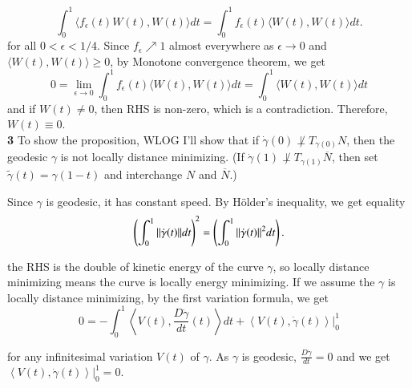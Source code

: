 \documentclass[a4paper, 12pt]{article}
\theoremstyle{Mydefinition}
\theoremstyle{Mytheorem}
\begin{document}
\begin{equation}
    \int_0^1 \langle f_\epsilon(t)W(t), W(t)\rangle dt = \int_0^1 f_\epsilon(t)\langle W(t), W(t)\rangle dt.
\end{equation}
for all $0<\epsilon<1/4$. Since $f_\epsilon\nearrow 1$ almost everywhere as $\epsilon\rightarrow 0$ and $\langle W(t), W(t)\rangle\geq 0$, by Monotone convergence theorem, we get 
\begin{equation}
    0 = \lim_{\epsilon\rightarrow 0}\int_0^1 f_\epsilon(t)\langle W(t), W(t)\rangle dt = \int_0^1 \langle W(t), W(t)\rangle dt
\end{equation}
and if $W(t)\neq 0$, then RHS is non-zero, which is a contradiction. Therefore, $W(t)\equiv 0$.\\

\noindent \textbf{3}
To show the proposition, WLOG I'll show that if $\dot{\gamma}(0)\not\perp T_{\gamma(0)}N$, then the geodesic $\gamma$ is not locally distance minimizing. (If $\dot{\gamma}(1)\not\perp T_{\gamma(1)}\overline{N}$, then set $\tilde{\gamma}(t) = \gamma(1-t)$ and interchange $N$ and $\overline{N}$.)

Since $\gamma$ is geodesic, it has constant speed. By H\"older's inequality, we get equality
\begin{equation}
    \left(\int_0^1 \norm{\dot{\gamma}(t)}dt\right)^2 = \left(\int_0^1 \norm{\dot{\gamma}(t)}^2dt\right).
\end{equation}

the RHS is the double of kinetic energy of the curve $\gamma$, so locally distance minimizing means the curve is locally energy minimizing. If we assume the $\gamma$ is locally distance minimizing, by the first variation formula, we get
\begin{equation}
    0 = -\int_0^1 \left\langle V(t), \frac{D\dot{\gamma}}{dt}(t)\right\rangle dt + \left.\left\langle V(t), \dot{\gamma}(t)\right\rangle\right|_0^1
\end{equation}

for any infinitesimal variation $V(t)$ of $\gamma$. As $\gamma$ is geodesic, $\frac{D\dot{\gamma}}{dt} = 0$ and we get $\left.\left\langle V(t), \dot{\gamma}(t)\right\rangle\right|_0^1 = 0$.
\end{document}
